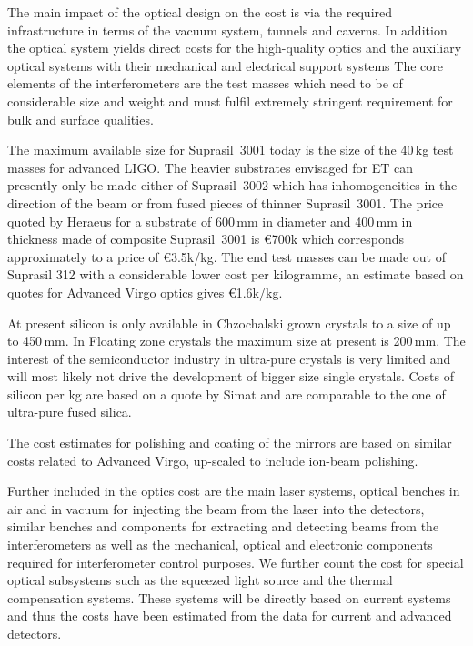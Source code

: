 %
%
The main impact of the optical design on the cost is via the required infrastructure in terms of the vacuum system,
tunnels and caverns. In addition the optical system yields direct costs 
for the high-quality optics and the auxiliary optical systems with their mechanical and electrical support systems
The core elements of the interferometers are the test masses which need to be of considerable size and weight 
and must fulfil extremely stringent requirement for bulk and surface qualities.

The maximum available size for Suprasil~3001 today is the size of the 40\,kg test masses for advanced LIGO. The heavier 
substrates envisaged for ET can presently only be made either of Suprasil~3002 which has inhomogeneities in the direction of the 
beam or from fused pieces of thinner Suprasil~3001. The price quoted by Heraeus for a substrate of 600\,mm in diameter 
and 400\,mm in thickness made of composite Suprasil~3001 is \euro700k which corresponds approximately to a 
price of \euro3.5k/kg. The end test masses can be made out of Suprasil 312 with a considerable lower cost per kilogramme,
an estimate based on quotes for Advanced Virgo optics gives \euro1.6k/kg.

At present silicon is only available in Chzochalski grown crystals to a size of up to 450\,mm.%
In Floating zone crystals the maximum size at present is 200\,mm. The interest of the semiconductor industry in ultra-pure crystals is 
very limited and will most likely not drive the development of bigger size single crystals.
Costs of silicon per kg are based on a quote by Simat and are comparable to the one of ultra-pure fused silica.

The cost estimates for polishing and coating of the mirrors are based on similar costs related to Advanced Virgo, up-scaled
to include ion-beam polishing.

Further included in the optics cost are the main laser systems, optical benches in air and in vacuum for injecting the beam from the laser
into the detectors, similar benches and components for extracting and detecting beams from the interferometers as well as
the mechanical, optical and electronic components required for interferometer control purposes. We further count the
cost for special optical subsystems such as the squeezed light source and the thermal compensation systems. These systems
will be directly based on current systems and thus the costs have been estimated from the data for current and advanced 
detectors.

